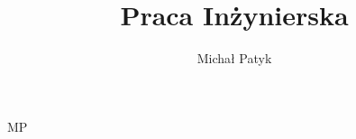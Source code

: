 \documentclass[10pt,a4paper,titlepage]{article}
\author{Michał Patyk}
\title{Praca Inżynierska}
\begin{document}
MP
\end{document}
